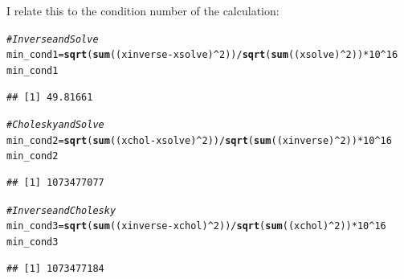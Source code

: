 \documentclass{llncs}\usepackage[]{graphicx}\usepackage[]{color}
\makeatletter
\newcommand{\hlnum}[1]{\textcolor[rgb]{0.686,0.059,0.569}{#1}}%
\newcommand{\hlcom}[1]{\textcolor[rgb]{0.678,0.584,0.686}{\textit{#1}}}%
\newcommand{\hlopt}[1]{\textcolor[rgb]{0,0,0}{#1}}%
\newcommand{\hlstd}[1]{\textcolor[rgb]{0.345,0.345,0.345}{#1}}%
\newcommand{\hlkwb}[1]{\textcolor[rgb]{0.69,0.353,0.396}{#1}}%
\newcommand{\hlkwd}[1]{\textcolor[rgb]{0.737,0.353,0.396}{\textbf{#1}}}%
\newenvironment{kframe}{%
 \def\at@end@of@kframe{}%
 \ifinner\ifhmode%
  \def\at@end@of@kframe{\end{minipage}}%
  \begin{minipage}{\columnwidth}%
 \fi\fi%
 \def\FrameCommand##1{\hskip\@totalleftmargin \hskip-\fboxsep
 \colorbox{shadecolor}{##1}\hskip-\fboxsep
     \hskip-\linewidth \hskip-\@totalleftmargin \hskip\columnwidth}%
 \MakeFramed {\advance\hsize-\width
   \@totalleftmargin\z@ \linewidth\hsize
   \@setminipage}}%
 {\par\unskip\endMakeFramed%
 \at@end@of@kframe}
\newenvironment{knitrout}{}{} %
\makeatother
\begin{document}
I relate this to the condition number of the calculation:
\begin{knitrout}
\color{fgcolor}\begin{kframe}
\begin{alltt}
\hlcom{# Inverse and Solve}
\hlstd{min_cond1}\hlkwb{=}\hlkwd{sqrt}\hlstd{(}\hlkwd{sum}\hlstd{((xinverse}\hlopt{-}\hlstd{xsolve)}\hlopt{^}\hlnum{2}\hlstd{))}\hlopt{/}\hlkwd{sqrt}\hlstd{(}\hlkwd{sum}\hlstd{((xsolve)}\hlopt{^}\hlnum{2}\hlstd{))}\hlopt{*}\hlnum{10}\hlopt{^}\hlnum{16}
\hlstd{min_cond1}
\end{alltt}
\begin{lstlisting}[basicstyle=\ttfamily,breaklines=true]
## [1] 49.81661
\end{lstlisting}
\begin{alltt}
\hlcom{# Cholesky and Solve}
\hlstd{min_cond2}\hlkwb{=}\hlkwd{sqrt}\hlstd{(}\hlkwd{sum}\hlstd{((xchol}\hlopt{-}\hlstd{xsolve)}\hlopt{^}\hlnum{2}\hlstd{))}\hlopt{/}\hlkwd{sqrt}\hlstd{(}\hlkwd{sum}\hlstd{((xinverse)}\hlopt{^}\hlnum{2}\hlstd{))}\hlopt{*}\hlnum{10}\hlopt{^}\hlnum{16}
\hlstd{min_cond2}
\end{alltt}
\begin{lstlisting}[basicstyle=\ttfamily,breaklines=true]
## [1] 1073477077
\end{lstlisting}
\begin{alltt}
\hlcom{# Inverse and Cholesky}
\hlstd{min_cond3}\hlkwb{=}\hlkwd{sqrt}\hlstd{(}\hlkwd{sum}\hlstd{((xinverse}\hlopt{-}\hlstd{xchol)}\hlopt{^}\hlnum{2}\hlstd{))}\hlopt{/}\hlkwd{sqrt}\hlstd{(}\hlkwd{sum}\hlstd{((xchol)}\hlopt{^}\hlnum{2}\hlstd{))}\hlopt{*}\hlnum{10}\hlopt{^}\hlnum{16}
\hlstd{min_cond3}
\end{alltt}
\begin{lstlisting}[basicstyle=\ttfamily,breaklines=true]
## [1] 1073477184
\end{lstlisting}
\end{kframe}
\end{knitrout}


\section{}
\end{document}
